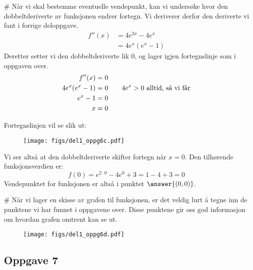 \begin{easylist}[enumerate]
	
	# Når vi skal bestemme eventuelle vendepunkt, kan vi undersøke hvor den dobbeltderiverte av funksjonen endrer fortegn. 
	Vi deriverer derfor den deriverte vi fant i forrige deloppgave. 
	\begin{align*}
		f''(x) & = 4e^{2x} - 4e^x \\
		& = 4e^x(e^x -1)
	\end{align*}
	Deretter setter vi den dobbeltderiverte lik $0$, og lager igjen fortegnslinje som i oppgaven over.
	\begin{align*}
		f''(x) & = 0 \\
		4e^x(e^x-1) & = 0 \qquad \textnormal{$4e^x > 0$ alltid, så vi får}\\ 
		e^x -1 & = 0 \\
		x & = 0
	\end{align*}
	
	Fortegnslinjen vil se slik ut:
	\begin{figure}[ht!]
		\centering
		\texttt{[image: figs/del1\_oppg6c.pdf]}
		\label{fig:del1_oppg6c}
	\end{figure}
	Vi ser altså at den dobbeltderiverte skifter fortegn når $x=0$. 
	Den tilhørende funksjonsverdien er: 
	\begin{equation*}
	f(0) = e^{2 \cdot 0} - 4e^0 + 3 = 1 -4 +3 = 0
	\end{equation*}	
	Vendepunktet for funksjonen er altså i punktet $\answer{(0,0)}$.
	
	# Når vi lager en skisse av grafen til funksjonen, er det veldig lurt å tegne inn de punktene vi har funnet i oppgavene over. 
	Disse punktene gir oss god informasjon om hvordan grafen omtrent kan se ut. 
	\begin{figure}[ht!]
		\centering
		\texttt{[image: figs/del1\_oppg6d.pdf]}
		\label{fig:del1_oppg6d}
	\end{figure}
\end{easylist}


\subsection*{Oppgave 7}

